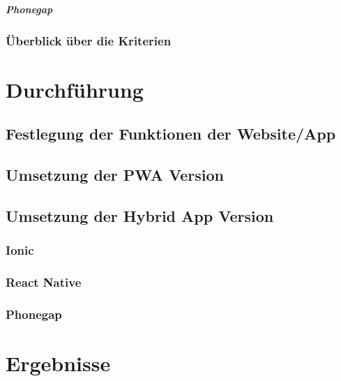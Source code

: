 			\paragraph{Phonegap}
			
	    \subsection{Überblick über die Kriterien}
		
\chapter{Durchführung}
	
	\section{Festlegung der Funktionen der Website/App}
			
	\section{Umsetzung der PWA Version}
			
	\section{Umsetzung der Hybrid App Version}
		
		\subsection{Ionic}
		
		\subsection{React Native}
		
		\subsection{Phonegap}

\chapter{Ergebnisse}
	
